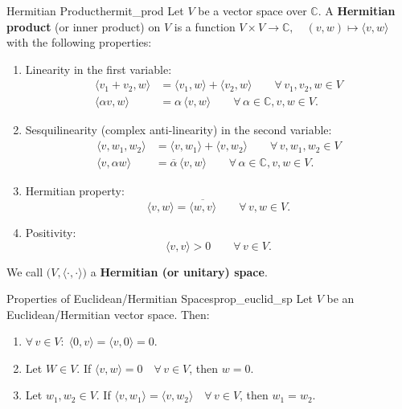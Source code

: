 \begin{definition}{Hermitian Product}{hermit_prod}
	Let $V$ be a vector space over $\mathbb{C}$. A \textbf{Hermitian product} (or inner product) on $V$ is a function $V \times V \to \mathbb{C}, \quad (v, w) \mapsto \langle v, w \rangle$ with the following properties:
	\begin{enumerate}
		\item Linearity in the first variable:
		\begin{align*}
			\langle v_1 + v_2, w\rangle &= \langle v_1, w\rangle + \langle v_2, w\rangle \qquad \forall \, v_1, v_2, w \in V\\
			\langle \alpha v, w\rangle &= \alpha \, \langle v, w\rangle \qquad \forall\, \alpha \in \mathbb{C}, v, w \in V. 
		\end{align*}
		\item Sesquilinearity (complex anti-linearity) in the second variable:
		\begin{align*}
			\langle v, w_1, w_2\rangle &= \langle v, w_1\rangle + \langle v, w_2\rangle \qquad \forall \, v, w_1, w_2 \in V\\
			\langle v, \alpha w\rangle &= \overline{\alpha} \, \langle v, w\rangle \qquad \forall\, \alpha \in \mathbb{C}, v, w \in V. 
		\end{align*}
		\item Hermitian property:
		\[
			\langle v, w \rangle = \overline{\langle w, v \rangle} \qquad \forall \, v, w \in V.
		\]
		\item Positivity:
		\[
			\langle v, v \rangle > 0 \qquad \forall \, v \in V.
		\]
	\end{enumerate}
	
	We call $\big(V, \langle \cdot , \cdot \rangle\big)$ a \textbf{Hermitian (or unitary) space}.
\end{definition}


\begin{lemma}{Properties of Euclidean/Hermitian Spaces}{prop_euclid_sp}
	Let $V$ be an Euclidean/Hermitian vector space. Then:
	\begin{enumerate}
		\item $\forall \, v \in V: \; \langle 0, v \rangle = \langle v, 0\rangle = 0$.
		\item Let $W \in V$. If $\langle v, w \rangle = 0 \quad \forall \, v \in V$, then $w = 0$.
		\item Let $w_1, w_2 \in V$. If $\langle v, w_1\rangle = \langle v, w_2\rangle \quad \forall \, v \in V$, then $w_1 = w_2$.
	\end{enumerate}
\end{lemma}


